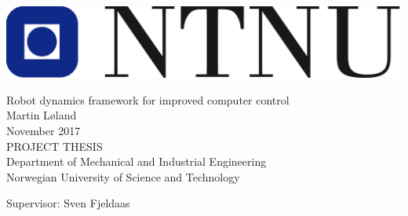 
\thispagestyle{empty}
\mbox{}\\[2pc]
\includegraphics[scale=0.6]{img/ntnu}
\mbox{}\\[6pc]
\begin{center}
\Huge{Robot dynamics framework for improved computer control}\\[2pc]

\Large{Martin Løland}\\[1pc]
\large{November 2017}\\[2pc]

PROJECT THESIS\\
Department of Mechanical and Industrial Engineering\\
Norwegian University of Science and Technology
\end{center}
\vfill

\noindent Supervisor: Sven Fjeldaas
